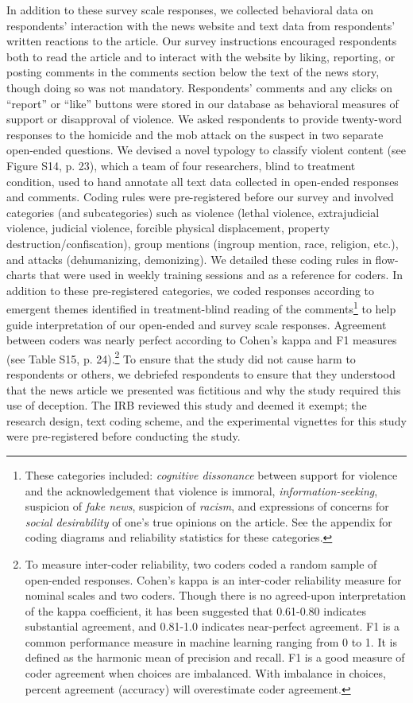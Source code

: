 \documentclass[12pt, letterpaper]{article}
\begin{document}
In addition to these survey scale responses, we collected behavioral data on respondents' interaction with the news website and text data from respondents' written reactions to the article. Our survey instructions encouraged respondents both to read the article and to interact with the website by liking, reporting, or posting comments in the comments section below the text of the news story, though doing so was not mandatory. Respondents' comments and any clicks on ``report'' or ``like'' buttons were stored in our database as behavioral measures of support or disapproval of violence. We asked respondents to provide twenty-word responses to the homicide and the mob attack on the suspect in two separate open-ended questions. We devised a novel typology to classify violent content (see Figure S14, p. 23), which a team of four researchers, blind to treatment condition, used to hand annotate all text data collected in open-ended responses and comments. Coding rules were pre-registered before our survey and involved categories (and subcategories) such as violence (lethal violence, extrajudicial violence, judicial violence, forcible physical displacement, property destruction/confiscation), group mentions (ingroup mention, race, religion, etc.), and attacks (dehumanizing, demonizing). We detailed these coding rules in flow-charts that were used in weekly training sessions and as a reference for coders. In addition to these pre-registered categories, we coded responses according to emergent themes identified in treatment-blind reading of the comments\footnote{These categories included: {\it cognitive dissonance} between support for violence and the acknowledgement that violence is immoral, {\it information-seeking}, suspicion of {\it fake news}, suspicion of {\it racism}, and expressions of concerns for {\it social desirability} of one's true opinions on the article. See the appendix for coding diagrams and reliability statistics for these categories.} to help guide interpretation of our open-ended and survey scale responses. Agreement between coders was nearly perfect according to Cohen's kappa and F1 measures (see Table S15, p. 24).\footnote{To measure inter-coder reliability, two coders coded a random sample of open-ended responses. Cohen's kappa is an inter-coder reliability measure for nominal scales and two coders. Though there is no agreed-upon interpretation of the kappa coefficient, it has been  suggested  that 0.61-0.80 indicates substantial  agreement, and 0.81-1.0 indicates near-perfect agreement. F1 is a common performance measure in machine learning ranging from 0 to 1. It is defined as the harmonic mean of precision and recall. F1 is a good measure of coder agreement when choices are imbalanced. With imbalance in choices, percent agreement (accuracy) will overestimate coder agreement.} To ensure that the study did not cause harm to respondents or others, we debriefed respondents to ensure that they understood that the news article we presented was fictitious and why the study required this use of deception. The IRB reviewed this study and deemed it exempt; the research design, text coding scheme, and the experimental vignettes for this study were pre-registered before conducting the study. 
\end{document}
